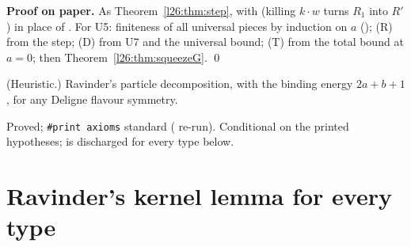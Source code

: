 \textbf{Proof on paper.} As Theorem~\ref{l26:thm:step}, with  (killing $k\cdot w$ turns $R_1$ into $R'$) in place of
. For U5: finiteness of all universal pieces by induction on $a$ (); (R) from the step; (D)
from U7 and the universal bound; (T) from the total bound at $a=0$; then Theorem~\ref{l26:thm:squeezeG}. \qed

\begin{physics}
(Heuristic.) Ravinder's particle decomposition, with the binding energy $2a+b+1$, for any Deligne flavour symmetry.
\end{physics}

\begin{status}
Proved; \texttt{\#print axioms} standard ( re-run). Conditional on the printed hypotheses;
 is discharged for every type below.
\end{status}

\section{Ravinder's kernel lemma for every type}\label{l26:sec:kernelG}

